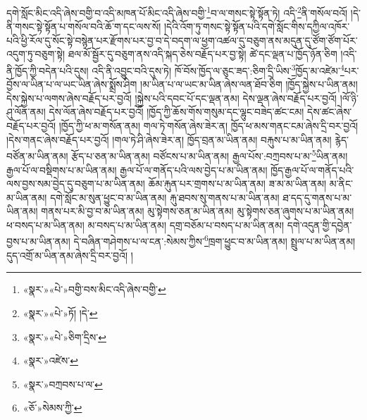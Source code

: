དགེ་སློང་མིང་འདི་ཞེས་བགྱི་བ་འདི་མཁན་པོ་མིང་འདི་ཞེས་བགྱི་\footnote{«སྣར་»«པེ་»བགྱི་བས་མིང་འདི་ཞེས་བགྱི་}བ་ལ་གསང་སྟེ་སྟོན་ཏེ། འདི་\footnote{«སྣར་»«པེ་»ཏོ། །དེ་}ནི་གསོལ་བའོ། །དེ་ནི་གསང་སྟེ་སྟོན་པ་གསོལ་བའི་ཆོ་ག་དང་ལས་སོ། །དེའི་འོག་ཏུ་གསང་སྟེ་སྟོན་པའི་དགེ་སློང་གིས་དཀྱིལ་འཁོར་པའི་ཕྱི་རོལ་དུ་སོང་སྟེ་བསྙེན་པར་རྫོགས་པར་བྱ་བ་དེ་བདག་ལ་ཕྱག་འཚལ་དུ་བཅུག་ནས་མདུན་དུ་ཙོག་ཙོག་པོར་འདུག་ཏུ་བཅུག་སྟེ། ཐལ་མོ་སྦྱོར་དུ་བཅུག་ནས་འདི་སྐད་ཅེས་བརྗོད་པར་བྱ་སྟེ། ཚེ་དང་ལྡན་པ་ཁྱོད་ཉོན་ཅིག །འདི་ནི་ཁྱོད་ཀྱི་བདེན་པའི་དུས། འདི་ནི་འབྱུང་བའི་དུས་ཏེ། ཁོ་བོས་ཁྱོད་ལ་ཅུང་ཟད་:ཅིག་དྲི་ཡིས་\footnote{«སྣར་»«པེ་»ཅིག་དྲིས་}ཁྱོད་མ་འཛེམ་\footnote{«སྣར་»འཛེས་}པར་བྱོས་ལ་ཡིན་པ་ལ་ཡང་ཡིན་ཞེས་སྨྲོས་ཤིག །མ་ཡིན་པ་ལ་ཡང་མ་ཡིན་ཞེས་ལན་ཐོབ་ཅིག །ཁྱོད་སྐྱེས་པ་ཡིན་ནམ། དེས་སྐྱེས་པ་ལགས་ཞེས་བརྗོད་པར་བྱའོ། །སྐྱེས་པའི་དབང་པོ་དང་ལྡན་ནམ། དེས་ལྡན་ཞེས་བརྗོད་པར་བྱའོ། །ལོ་ཉི་ཤུ་ལོན་ནམ། དེས་ལོན་ཞེས་བརྗོད་པར་བྱའོ། །ཁྱོད་ཀྱི་ཆོས་གོས་གསུམ་དང་ལྷུང་བཟེད་ཚང་ངམ། དེས་ཚང་ཞེས་བརྗོད་པར་བྱའོ། །ཁྱོད་ཀྱི་ཕ་མ་གསོན་ནམ། གལ་ཏེ་གསོན་ཞེས་ཟེར་ན། ཁྱོད་ཕ་མས་གནང་ངམ་ཞེས་དྲི་བར་བྱའོ། །དེས་གནང་ཞེས་བརྗོད་པར་བྱའོ། །གལ་ཏེ་ཤི་ཞེས་ཟེར་ན། ཁྱོད་བྲན་མ་ཡིན་ནམ། བརྐུས་པ་མ་ཡིན་ནམ། རྙེད་བཙོན་མ་ཡིན་ནམ། རྩོད་པ་ཅན་མ་ཡིན་ནམ། བཙོངས་པ་མ་ཡིན་ནམ། རྒྱལ་པོས་:བཀྲབས་པ་མ་\footnote{«སྣར་»བཀྲབས་པ་ལ་}ཡིན་ནམ། རྒྱལ་པོ་ལ་བསྡིགས་པ་མ་ཡིན་ནམ། རྒྱལ་པོ་ལ་གནོད་པའི་ལས་བྱེད་པ་མ་ཡིན་ནམ། ཁྱོད་རྒྱལ་པོ་ལ་གནོད་པའི་ལས་བྱས་སམ་བྱེད་དུ་བཅུག་པ་མ་ཡིན་ནམ། ཆོམ་རྐུན་པར་གྲགས་པ་མ་ཡིན་ནམ། ཟ་མ་མ་ཡིན་ནམ། མ་ནིང་མ་ཡིན་ནམ། དགེ་སློང་མ་སུན་ཕྱུང་བ་མ་ཡིན་ནམ། རྐུ་ཐབས་སུ་གནས་པ་མ་ཡིན་ནམ། ཐ་དད་དུ་གནས་པ་མ་ཡིན་ནམ། གནས་པར་མི་བྱ་བ་མ་ཡིན་ནམ། མུ་སྟེགས་ཅན་མ་ཡིན་ནམ། མུ་སྟེགས་ཅན་ཞུགས་པ་མ་ཡིན་ནམ། ཕ་བསད་པ་མ་ཡིན་ནམ། མ་བསད་པ་མ་ཡིན་ནམ། དགྲ་བཅོམ་པ་བསད་པ་མ་ཡིན་ནམ། དགེ་འདུན་གྱི་དབྱེན་བྱས་པ་མ་ཡིན་ནམ། དེ་བཞིན་གཤེགས་པ་ལ་ངན་:སེམས་ཀྱིས་\footnote{«ཅོ་»སེམས་ཀྱི་}ཁྲག་ཕྱུང་བ་མ་ཡིན་ནམ། སྤྲུལ་པ་མ་ཡིན་ནམ། དུད་འགྲོ་མ་ཡིན་ནམ་ཞེས་དྲི་བར་བྱའོ། །
